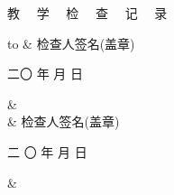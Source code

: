 \documentclass[a4paper,12pt]{article}
\numberwithin{table}{section}
\numberwithin{figure}{section}
\begin{document}
\newpage
\pagestyle{empty}
\begin{center}
	\huge \hei 教 ~~学 ~~检 ~~查 ~~记~~ 录
	
	\song\normalsize 
	\begin{tabu} to \textwidth {|X[1,c,m]|X[10,r,m]|N}
		\hline
	  &\vspace{7cm}  检查人签名(盖章) 
	\hspace{4cm} \par  二〇 \underline{\hspace{1em}}   
	年\underline{\hspace{1em}}   月 \underline{\hspace{1em}}  日 
	\hspace{1cm}  \par &\\ [8cm] \hline
	 & \vspace{7cm}  检查人签名(盖章) 
	\hspace{4cm} \par  二 〇  \underline{\hspace{1em}} 年  
	\underline{\hspace{1em}} 月 \underline{\hspace{1em}}  日 \hspace{1cm} 
	\par & \\[8cm] \hline	
	\end{tabu}
\end{center}




%
%
%
%
%
%
%
\end{document}
